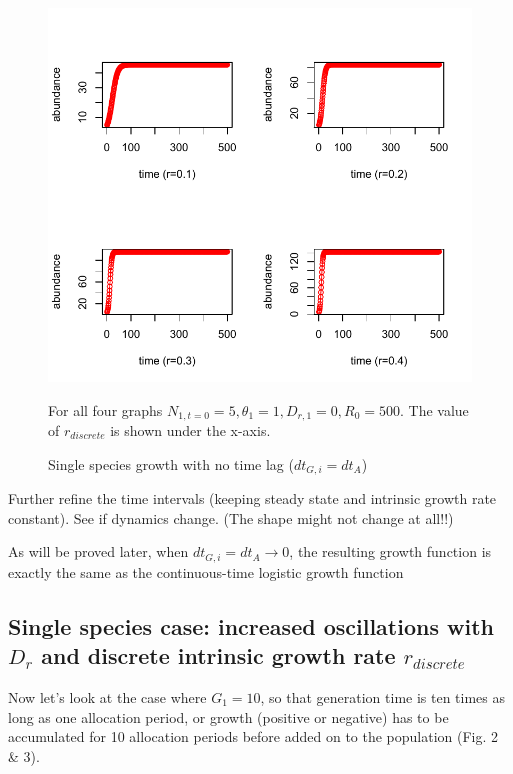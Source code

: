 \documentclass[12pt]{article}
\begin{document}
\begin{figure}
 \includegraphics[width=\textwidth]{1sp_no_sojourn.pdf}
 \caption{Single species growth with no time lag ($d t_{G,i}=d t_A$)}
For all four graphs $ N_{1,t=0}=5, \theta_1=1, D_{r,1} = 0, R_0=500$. The value of $r_{discrete}$ is shown under the x-axis.
\end{figure}

Further refine the time intervals (keeping steady state and intrinsic growth rate constant). See if dynamics change. (The shape might not change at all!!)

As will be proved later, when $d t_{G,i}=d t_A \to 0$, the resulting growth function is exactly the same as the continuous-time logistic growth function

\subsection{Single species case: increased oscillations with $D_r$ and discrete intrinsic growth rate $r_{discrete}$}

Now let's look at the case where $G_1=10$, so that generation time is ten times as long as one allocation period, or growth (positive or negative) has to be accumulated for 10 allocation periods before added on to the population (Fig. 2 \& 3).
\end{document}

